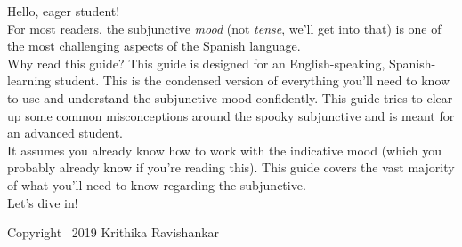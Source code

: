 Hello, eager student!\\

For most readers, the subjunctive \textit{mood} (not \textit{tense}, we'll get into that) is one of the most challenging aspects of the Spanish language. \\

Why read this guide? This guide is designed for an English-speaking, Spanish-learning student. This is the condensed version of everything you'll need to know to use and understand the subjunctive mood confidently. This guide tries to clear up some common misconceptions around the spooky subjunctive and is meant for an advanced student. \\

It assumes you already know how to work with the indicative mood (which you probably already know if you're reading this). This guide covers the vast majority of what you'll need to know regarding the subjunctive.  \\

Let's dive in!

\vfill
{\footnotesize Copyright \textcopyright\ 2019 Krithika Ravishankar}
